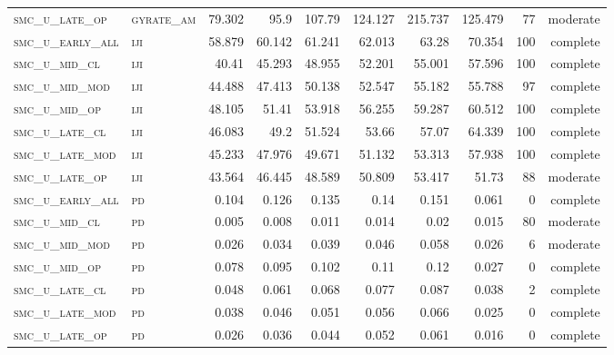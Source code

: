\begin{landscape}
\begin{center}
\begin{footnotesize}
\begin{longtable}{llrrrrr|rrr}
\textsc{smc\_u\_late\_op  } & \textsc{gyrate\_am}   & 79.302   & 95.9     & 107.79   & 124.127  & 215.737  & 125.479  & 77  & moderate \\
\textsc{smc\_u\_early\_all} & \textsc{iji       }   & 58.879   & 60.142   & 61.241   & 62.013   & 63.28    & 70.354   & 100 & complete \\
\textsc{smc\_u\_mid\_cl   } & \textsc{iji       }   & 40.41    & 45.293   & 48.955   & 52.201   & 55.001   & 57.596   & 100 & complete \\
\textsc{smc\_u\_mid\_mod  } & \textsc{iji       }   & 44.488   & 47.413   & 50.138   & 52.547   & 55.182   & 55.788   & 97  & complete \\
\textsc{smc\_u\_mid\_op   } & \textsc{iji       }   & 48.105   & 51.41    & 53.918   & 56.255   & 59.287   & 60.512   & 100 & complete \\
\textsc{smc\_u\_late\_cl  } & \textsc{iji       }   & 46.083   & 49.2     & 51.524   & 53.66    & 57.07    & 64.339   & 100 & complete \\
\textsc{smc\_u\_late\_mod } & \textsc{iji       }   & 45.233   & 47.976   & 49.671   & 51.132   & 53.313   & 57.938   & 100 & complete \\
\textsc{smc\_u\_late\_op  } & \textsc{iji       }   & 43.564   & 46.445   & 48.589   & 50.809   & 53.417   & 51.73    & 88  & moderate \\
\textsc{smc\_u\_early\_all} & \textsc{pd        }   & 0.104    & 0.126    & 0.135    & 0.14     & 0.151    & 0.061    & 0   & complete \\
\textsc{smc\_u\_mid\_cl   } & \textsc{pd        }   & 0.005    & 0.008    & 0.011    & 0.014    & 0.02     & 0.015    & 80  & moderate \\
\textsc{smc\_u\_mid\_mod  } & \textsc{pd        }   & 0.026    & 0.034    & 0.039    & 0.046    & 0.058    & 0.026    & 6   & moderate \\
\textsc{smc\_u\_mid\_op   } & \textsc{pd        }   & 0.078    & 0.095    & 0.102    & 0.11     & 0.12     & 0.027    & 0   & complete \\
\textsc{smc\_u\_late\_cl  } & \textsc{pd        }   & 0.048    & 0.061    & 0.068    & 0.077    & 0.087    & 0.038    & 2   & complete \\
\textsc{smc\_u\_late\_mod } & \textsc{pd        }   & 0.038    & 0.046    & 0.051    & 0.056    & 0.066    & 0.025    & 0   & complete \\
\textsc{smc\_u\_late\_op  } & \textsc{pd        }   & 0.026    & 0.036    & 0.044    & 0.052    & 0.061    & 0.016    & 0   & complete \\

\end{longtable}
\end{footnotesize}
\end{center}
\end{landscape}
